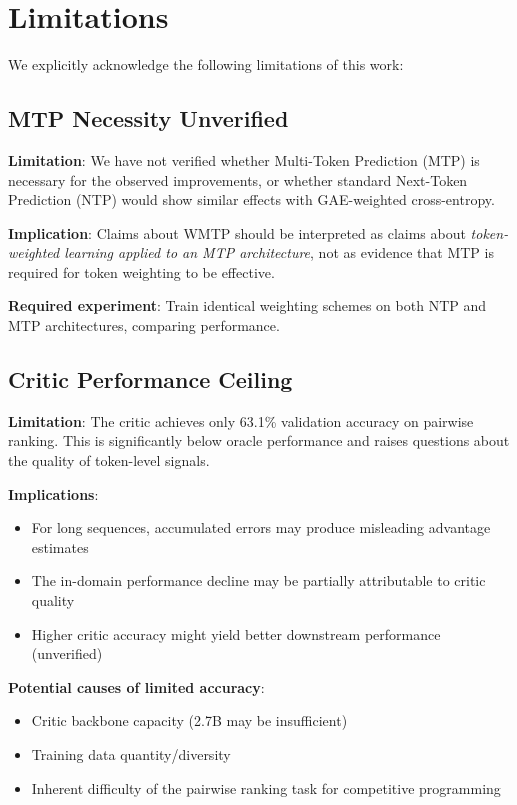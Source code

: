\section{Limitations}

We explicitly acknowledge the following limitations of this work:

\subsection{MTP Necessity Unverified}

\textbf{Limitation}: We have not verified whether Multi-Token Prediction (MTP) is necessary for the observed improvements, or whether standard Next-Token Prediction (NTP) would show similar effects with GAE-weighted cross-entropy.

\textbf{Implication}: Claims about WMTP should be interpreted as claims about \textit{token-weighted learning applied to an MTP architecture}, not as evidence that MTP is required for token weighting to be effective.

\textbf{Required experiment}: Train identical weighting schemes on both NTP and MTP architectures, comparing performance.

\subsection{Critic Performance Ceiling}

\textbf{Limitation}: The critic achieves only 63.1\% validation accuracy on pairwise ranking. This is significantly below oracle performance and raises questions about the quality of token-level signals.

\textbf{Implications}:
\begin{itemize}[nosep]
    \item For long sequences, accumulated errors may produce misleading advantage estimates
    \item The in-domain performance decline may be partially attributable to critic quality
    \item Higher critic accuracy might yield better downstream performance (unverified)
\end{itemize}

\textbf{Potential causes of limited accuracy}:
\begin{itemize}[nosep]
    \item Critic backbone capacity (2.7B may be insufficient)
    \item Training data quantity/diversity
    \item Inherent difficulty of the pairwise ranking task for competitive programming
\end{itemize}

